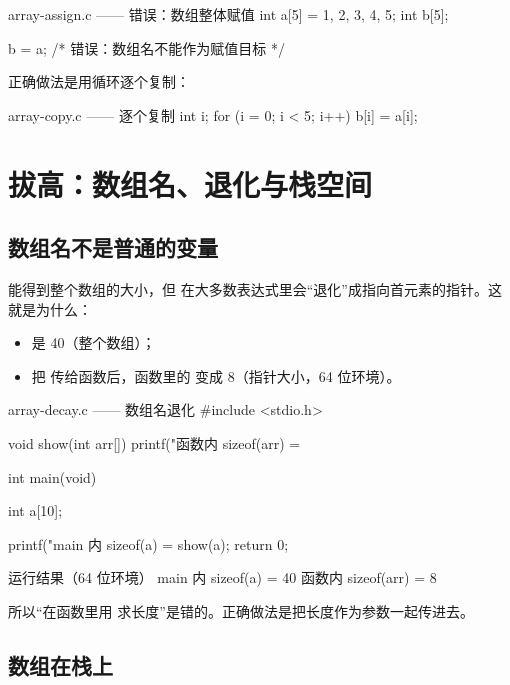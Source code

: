 \begin{pitfall}[数组不能整体赋值]
\begin{codebox}{array-assign.c —— 错误：数组整体赋值}
int a[5] = {1, 2, 3, 4, 5};
int b[5];

b = a;      /* 错误：数组名不能作为赋值目标 */
\end{codebox}
正确做法是用循环逐个复制：
\begin{codebox}{array-copy.c —— 逐个复制}
int i;
for (i = 0; i < 5; i++) {
    b[i] = a[i];
}
\end{codebox}
\end{pitfall}

\section{拔高：数组名、退化与栈空间}

\subsection{数组名不是普通的变量}

 能得到整个数组的大小，但  在大多数表达式里会“退化”成指向首元素的指针。这就是为什么：

\begin{itemize}
  \item {} 是 40（整个数组）；
  \item 把  传给函数后，函数里的  变成 8（指针大小，64 位环境）。
\end{itemize}

\begin{codebox}{array-decay.c —— 数组名退化}
#include <stdio.h>

void show(int arr[])
{
    printf("函数内 sizeof(arr) = %
}

int main(void)
{
    int a[10];

    printf("main 内 sizeof(a) = %
    show(a);
    return 0;
}
\end{codebox}

\begin{outbox}{运行结果（64 位环境）}
main 内 sizeof(a) = 40
函数内 sizeof(arr) = 8
\end{outbox}

所以“在函数里用  求长度”是错的。正确做法是把长度作为参数一起传进去。

\subsection{数组在栈上}


